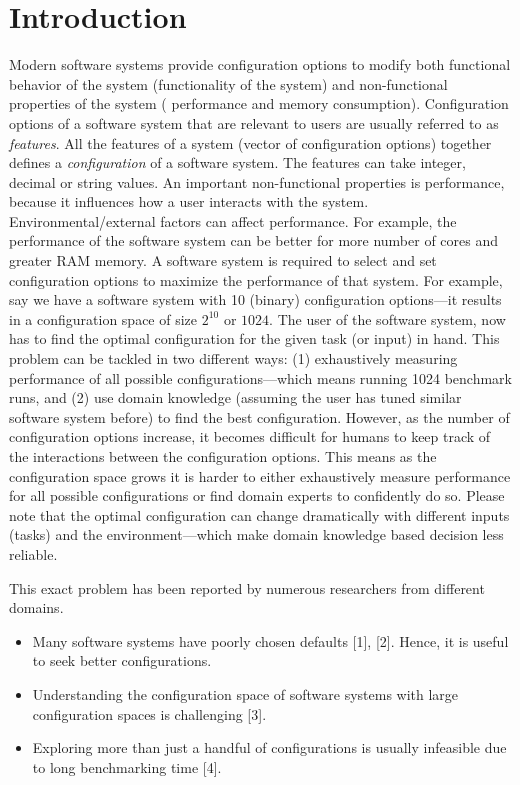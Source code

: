 \chapter{Introduction}
\label{chapter:one}


Modern software systems provide configuration options to modify
both functional behavior of the system (functionality of the system) and non-functional properties of the system ( performance and memory
consumption). 
Configuration options of a software system that are relevant to users are usually referred to as
\textit{features}. All the features of a system (vector of configuration options) together defines a \textit{configuration} of a software system. The features can  take integer, decimal or string values.  An important non-functional properties is performance, because it  influences  how a user interacts with the system. 
Environmental/external factors can affect performance. For example, the performance of the software system can be better for more number of cores and greater RAM memory.  A software system is required to select and set configuration options to maximize the performance of that system. For example, say we have a software system with 10 (binary) configuration options---it results in a configuration space of size $2^{10}$ or $1024$. The user of the software system, now has to find the optimal configuration for the given task (or input) in hand. 
This problem can be tackled in two different ways: (1) exhaustively measuring performance of all possible configurations---which means running 1024 benchmark runs, and (2) use domain knowledge (assuming the user has tuned similar software system before) to find the best configuration. 
However, as the number of configuration options increase, it
becomes difficult for humans to keep track of the interactions between the configuration options. This means as the configuration space grows it is harder to either exhaustively measure performance for all possible configurations or find domain experts to confidently do so. Please note that the optimal configuration can change dramatically with different inputs (tasks) and the environment---which make domain knowledge based decision less reliable. 

This exact problem has been reported by numerous researchers from different domains.
\begin{itemize}
\item Many software systems have poorly chosen defaults [1], [2]. Hence, it is useful to seek better configurations.
\item Understanding the configuration space of software systems with large configuration spaces is challenging [3].
\item Exploring more than just a handful of configurations is usually infeasible due to long benchmarking time [4].
\end{itemize}


